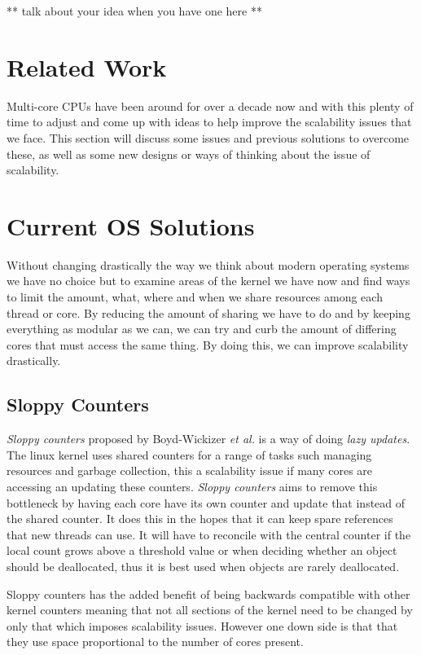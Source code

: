 \documentclass[journal]{IEEEtran}
\begin{document}
** talk about your idea when you have one here **

\section{Related Work}

Multi-core CPUs have been around for over a decade now and with this plenty of time to adjust and come up with ideas to help improve the scalability issues that we face. This section will discuss some issues and previous solutions to overcome these, as well as some new designs or ways of thinking about the issue of scalability. 

\section{Current OS Solutions}

Without changing drastically the way we think about modern operating systems we have no choice but to examine areas of the kernel we have now and find ways to limit the amount, what, where and when we share resources among each thread or core. By reducing the amount of sharing we have to do and by keeping everything as modular as we can, we can try and curb the amount of differing cores that must access the same thing. By doing this, we can improve scalability drastically. 

\subsection{Sloppy Counters}
\emph{Sloppy counters} proposed by Boyd-Wickizer \emph{et al.} is a way of doing \emph{lazy updates}. The linux kernel uses shared counters for a range of tasks such managing resources and garbage collection, this a scalability issue if many cores are accessing an updating these counters. \emph{Sloppy counters} aims to remove this bottleneck by having each core have its own counter and update that instead of the shared counter. It does this in the hopes that it can keep spare references that new threads can use. It will have to reconcile with the central counter if the local count grows above a threshold value or when deciding whether an object should be deallocated, thus it is best used when objects are rarely deallocated.  

Sloppy counters has the added benefit of being backwards compatible with other kernel counters meaning that not all sections of the kernel need to be changed by only that which imposes scalability issues. However one down side is that that they use space proportional to the number of cores present.
\end{document}
